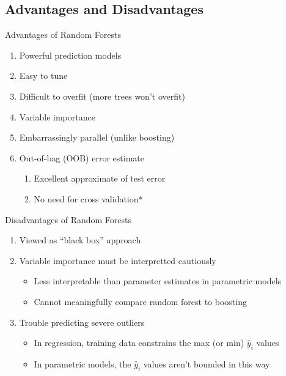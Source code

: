 \documentclass[pdf]{beamer}
\begin{document}
	\subsection{Advantages and Disadvantages}
		\begin{frame}{Advantages of Random Forests}
			\begin{enumerate}
				\item Powerful prediction models
				\item Easy to tune
				\item Difficult to overfit (more trees won't overfit)
				\item Variable importance
				\item Embarrassingly parallel (unlike boosting)
				\item Out-of-bag (OOB) error estimate
					\begin{enumerate}[1]
						\item Excellent approximate of test error
						\item No need for cross validation*
					\end{enumerate}

			\end{enumerate}
		\end{frame}

		\begin{frame}{Disadvantages of Random Forests}
			\begin{enumerate}
				\item Viewed as ``black box'' approach
				\item Variable importance must be interpretted cautiously
					\begin{itemize}
						\item Less interpretable than parameter estimates in parametric models
						\item Cannot meaningfully compare random forest to boosting 
					\end{itemize}  
				\item Trouble predicting severe outliers
					\begin{itemize}
						\item In regression, training data constrains the max (or min) $\hat{y}_i$ values 
						\item In parametric models, the $\hat{y}_i$ values aren't bounded in this way
					\end{itemize}
				
			\end{enumerate}
		\end{frame}
	
\end{document}
